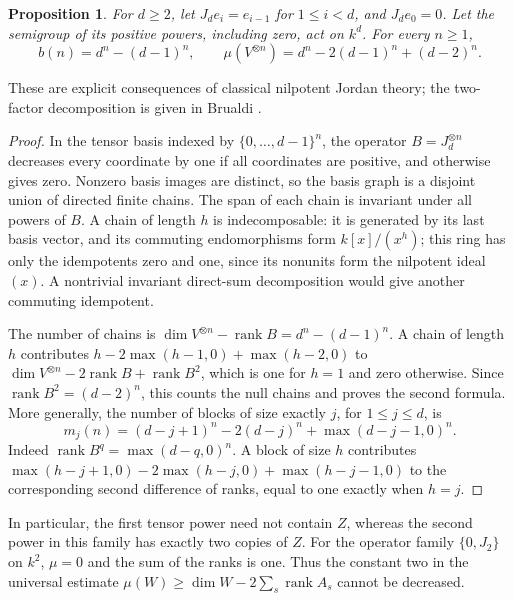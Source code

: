 \documentclass[11pt]{article}
\newtheorem{proposition}[theorem]{Proposition}
\newcommand{\rank}{\operatorname{rank}}
\begin{document}
\begin{proposition}\label{prop:jordan}
For \(d\geq2\), let \(J_d e_i=e_{i-1}\) for \(1\leq i<d\), and
\(J_de_0=0\). Let the semigroup of its positive powers, including zero, act
on \(k^d\). For every \(n\geq1\),
\[
 b(n)=d^n-(d-1)^n,\qquad
 \mu(V^{\otimes n})=d^n-2(d-1)^n+(d-2)^n.
\]
\end{proposition}
These are explicit consequences of classical nilpotent Jordan theory;
the two-factor decomposition is given in
Brualdi \cite[Theorem~4.6(4), p.~47]{Bru85}.
\begin{proof}
In the tensor basis indexed by \(\{0,\ldots,d-1\}^n\), the operator
\(B=J_d^{\otimes n}\) decreases every coordinate by one if all coordinates are
positive, and otherwise gives zero. Nonzero basis images are distinct, so the
basis graph is a disjoint union of directed finite chains. The span of each
chain is invariant under all powers of \(B\). A chain of length \(h\) is
indecomposable: it is generated by its last basis vector, and its commuting
endomorphisms form \(k[x]/(x^h)\); this ring has only the idempotents zero and
one, since its nonunits form the nilpotent ideal \((x)\). A nontrivial invariant
direct-sum decomposition would give another commuting idempotent.

The number of chains is \(\dim V^{\otimes n}-\rank B=d^n-(d-1)^n\).
A chain of length \(h\) contributes
\(h-2\max(h-1,0)+\max(h-2,0)\) to
\(\dim V^{\otimes n}-2\rank B+\rank B^2\), which is one for \(h=1\) and
zero otherwise. Since \(\rank B^2=(d-2)^n\), this counts the null chains and
proves the second formula.
More generally, the number of blocks of size exactly \(j\), for \(1\leq j\leq d\), is
\begin{equation}\label{eq:jordanall}
 m_j(n)=(d-j+1)^n-2(d-j)^n+\max(d-j-1,0)^n.
\end{equation}
Indeed \(\rank B^q=\max(d-q,0)^n\). A block of size \(h\) contributes
\(\max(h-j+1,0)-2\max(h-j,0)+\max(h-j-1,0)\) to the corresponding
second difference of ranks, equal to one exactly when \(h=j\).
\end{proof}
In particular, the first tensor power need not contain \(Z\), whereas the second
power in this family has exactly two copies of \(Z\). For the operator family
\(\{0,J_2\}\) on \(k^2\), \(\mu=0\) and the sum of the ranks is one.
Thus the constant two in the universal estimate
\(\mu(W)\geq\dim W-2\sum_s\rank A_s\) cannot be decreased.
\end{document}
